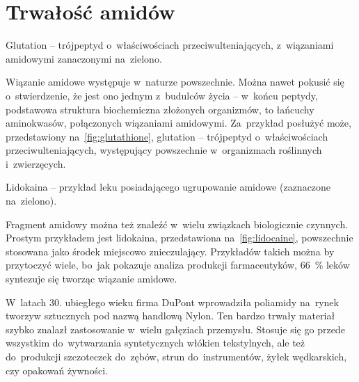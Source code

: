 \section{Trwałość amidów}\label{literature:amide-stability}
\begin{marginfigure}[7\baselineskip]
  
  \caption{
    Glutation \--- trójpeptyd o~właściwościach przeciwulteniających,
    z~wiązaniami amidowymi zanaczonymi na~zielono.
  }
  \label{fig:glutathione}
\end{marginfigure}
Wiązanie amidowe występuje w~naturze powszechnie.
Można nawet pokusić się o~stwierdzenie, że jest ono jednym z~budulców życia \---
  w~końcu peptydy, podstawowa struktura biochemiczna złożonych organizmów,
  to łańcuchy aminokwasów, połączonych wiązaniami amidowymi.
Za~przykład posłużyć może, przedstawiony na~\cref{fig:glutathione}, glutation \---
  trójpeptyd o~właściwościach przeciwulteniających,
  występujący powszechnie w~organizmach roślinnych i~zwierzęcych.
  
\begin{marginfigure}
  
  \caption{
    Lidokaina \--- przykład leku posiadającego ugrupowanie amidowe
    (zaznaczone na~zielono).
  }
  \label{fig:lidocaine}
\end{marginfigure}
Fragment amidowy można też znaleźć w~wielu związkach biologicznie czynnych.
Prostym przykładem jest lidokaina, przedstawiona na~\cref{fig:lidocaine},
  powszechnie stosowana jako środek miejscowo znieczulający.
Przykładów takich można by przytoczyć wiele, bo~jak pokazuje analiza produkcji farmaceutyków,
  \SI{66}{\percent} leków syntezuje się tworząc wiązanie amidowe.

W~latach 30. ubiegłego wieku firma DuPont wprowadziła poliamidy na~rynek tworzyw
  sztucznych pod nazwą handlową Nylon.
Ten bardzo trwały materiał szybko znalazł zastosowanie w~wielu gałęziach przemysłu.
Stosuje się go przede wszystkim do~wytwarzania syntetycznych włókien tekstylnych,
  ale też do~produkcji szczoteczek do~zębów, strun do~instrumentów,
  żyłek wędkarskich, czy opakowań żywności.

